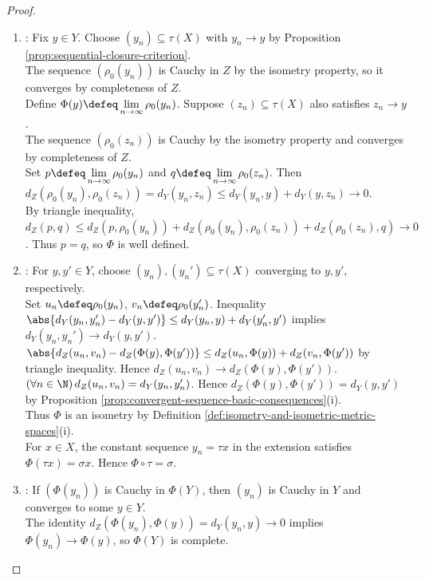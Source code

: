 \begin{theorem}
\begin{proof}
\begin{enumerate}[label=(\roman*)]
\begin{enumerate}[label=(\alph*)]
For $x,x'\in X$, $d_Z(\rho_0(\tau x),\rho_0(\tau x'))=d(x,x')=d_Y(\tau x,\tau x')$. Hence $\rho_0$ is a bijective isometry by Definition \ref{def:isometry-and-isometric-metric-spaces}(i).
\item {}: Fix $y\in Y$. Choose $(y_n)\subseteq\tau(X)$ with $y_n\to y$ by Proposition \ref{prop:sequential-closure-criterion}.\\
The sequence $(\rho_0(y_n))$ is Cauchy in $Z$ by the isometry property, so it converges by completeness of $Z$.\\
Define $\Phi(y)\defeq\lim\limits_{n\to\infty}\rho_0(y_n)$. Suppose $(z_n)\subseteq\tau(X)$ also satisfies $z_n\to y$.\\
The sequence $(\rho_0(z_n))$ is Cauchy by the isometry property and converges by completeness of $Z$.\\
Set $p\defeq\lim\limits_{n\to\infty}\rho_0(y_n)$ and $q\defeq\lim\limits_{n\to\infty}\rho_0(z_n)$. Then $d_Z(\rho_0(y_n),\rho_0(z_n))=d_Y(y_n,z_n)\leq d_Y(y_n,y)+d_Y(y,z_n)\to0$.\\
By triangle inequality, $d_Z(p,q)\leq d_Z(p,\rho_0(y_n))+d_Z(\rho_0(y_n),\rho_0(z_n))+d_Z(\rho_0(z_n),q)\to0$. Thus $p=q$, so $\Phi$ is well defined.
\item {}: For $y,y'\in Y$, choose $(y_n),(y_n')\subseteq\tau(X)$ converging to $y,y'$, respectively.\\
Set $u_n\defeq\rho_0(y_n)$, $v_n\defeq\rho_0(y_n')$. Inequality $\abs{d_Y(y_n,y_n')-d_Y(y,y')}\leq d_Y(y_n,y)+d_Y(y_n',y')$ implies $d_Y(y_n,y_n')\to d_Y(y,y')$.\\
$\abs{d_Z(u_n,v_n)-d_Z(\Phi(y),\Phi(y'))}\leq d_Z(u_n,\Phi(y))+d_Z(v_n,\Phi(y'))$ by triangle inequality. Hence $d_Z(u_n,v_n)\to d_Z(\Phi(y),\Phi(y'))$.\\
$(\forall n\in\N)\,d_Z(u_n,v_n)=d_Y(y_n,y_n')$. Hence $d_Z(\Phi(y),\Phi(y'))=d_Y(y,y')$ by Proposition \ref{prop:convergent-sequence-basic-consequences}(i).\\
Thus $\Phi$ is an isometry by Definition \ref{def:isometry-and-isometric-metric-spaces}(i).\\
For $x\in X$, the constant sequence $y_n=\tau x$ in the extension satisfies $\Phi(\tau x)=\sigma x$. Hence $\Phi\circ\tau=\sigma$.
\item {}: If $(\Phi(y_n))$ is Cauchy in $\Phi(Y)$, then $(y_n)$ is Cauchy in $Y$ and converges to some $y\in Y$.\\
The identity $d_Z(\Phi(y_n),\Phi(y))=d_Y(y_n,y)\to0$ implies $\Phi(y_n)\to\Phi(y)$, so $\Phi(Y)$ is complete.\\

\end{enumerate}
\end{enumerate}
\end{proof}
\end{theorem}
